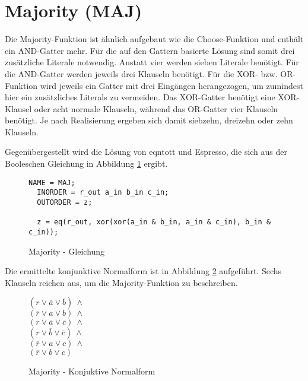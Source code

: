 \section{Majority (MAJ)}
\label{sec:knf:maj}

Die Majority-Funktion ist ähnlich aufgebaut wie die Choose-Funktion und enthält ein AND-Gatter mehr. Für die auf den Gattern basierte Lösung sind somit drei zusätzliche
Literale notwendig. Anstatt vier werden sieben Literale benötigt. Für die AND-Gatter werden jeweils drei Klauseln benötigt. Für die XOR- bzw. OR-Funktion wird jeweils
ein Gatter mit drei Eingängen herangezogen, um zumindest hier ein zusätzliches Literals zu vermeiden. Das XOR-Gatter benötigt eine XOR-Klausel oder acht normale Klauseln,
während das OR-Gatter vier Klauseln benötigt. Je nach Realisierung ergeben sich damit siebzehn, dreizehn oder zehn Klauseln.

Gegenübergestellt wird die Lösung von eqntott und Espresso, die sich aus der Booleschen Gleichung in Abbildung \ref{fig:majority_eqn} ergibt.
\begin{figure}[!h]
  \centering
  \begin{lstlisting}[]
  NAME = MAJ;
  INORDER = r_out a_in b_in c_in;
  OUTORDER = z;

  z = eq(r_out, xor(xor(a_in & b_in, a_in & c_in), b_in & c_in));
  \end{lstlisting}
  \caption{Majority - Gleichung}
  \label{fig:majority_eqn}
\end{figure}

Die ermittelte konjunktive Normalform ist in Abbildung \ref{fig:majority_cnf} aufgeführt.
Sechs Klauseln reichen aus, um die Majority-Funktion zu beschreiben.
\begin{figure}[!h]
  \centering
  \begin{minipage}[l]{2cm}
    $ (r \vee \overline{a} \vee \overline{b}) ~ \wedge $\\
    $ (\overline{r} \vee a \vee b) ~ \wedge $\\
    $ (r \vee \overline{a} \vee \overline{c}) ~ \wedge $\\
    $ (r \vee \overline{b} \vee \overline{c}) ~ \wedge $\\
    $ (\overline{r} \vee a \vee c) ~ \wedge $\\
    $ (\overline{r} \vee b \vee c) $
  \end{minipage}
  \caption{Majority - Konjuktive Normalform}
  \label{fig:majority_cnf}
\end{figure}

